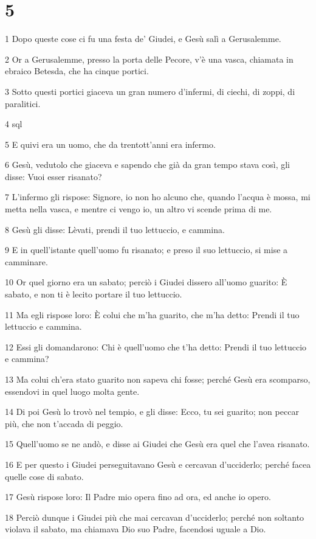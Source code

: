 \chapter{5}

\par 1 Dopo queste cose ci fu una festa de' Giudei, e Gesù salì a Gerusalemme.
\par 2 Or a Gerusalemme, presso la porta delle Pecore, v'è una vasca, chiamata in ebraico Betesda, che ha cinque portici.
\par 3 Sotto questi portici giaceva un gran numero d'infermi, di ciechi, di zoppi, di paralitici.
\par 4 sql
\par 5 E quivi era un uomo, che da trentott'anni era infermo.
\par 6 Gesù, vedutolo che giaceva e sapendo che già da gran tempo stava così, gli disse: Vuoi esser risanato?
\par 7 L'infermo gli rispose: Signore, io non ho alcuno che, quando l'acqua è mossa, mi metta nella vasca, e mentre ci vengo io, un altro vi scende prima di me.
\par 8 Gesù gli disse: Lèvati, prendi il tuo lettuccio, e cammina.
\par 9 E in quell'istante quell'uomo fu risanato; e preso il suo lettuccio, si mise a camminare.
\par 10 Or quel giorno era un sabato; perciò i Giudei dissero all'uomo guarito: È sabato, e non ti è lecito portare il tuo lettuccio.
\par 11 Ma egli rispose loro: È colui che m'ha guarito, che m'ha detto: Prendi il tuo lettuccio e cammina.
\par 12 Essi gli domandarono: Chi è quell'uomo che t'ha detto: Prendi il tuo lettuccio e cammina?
\par 13 Ma colui ch'era stato guarito non sapeva chi fosse; perché Gesù era scomparso, essendovi in quel luogo molta gente.
\par 14 Di poi Gesù lo trovò nel tempio, e gli disse: Ecco, tu sei guarito; non peccar più, che non t'accada di peggio.
\par 15 Quell'uomo se ne andò, e disse ai Giudei che Gesù era quel che l'avea risanato.
\par 16 E per questo i Giudei perseguitavano Gesù e cercavan d'ucciderlo; perché facea quelle cose di sabato.
\par 17 Gesù rispose loro: Il Padre mio opera fino ad ora, ed anche io opero.
\par 18 Perciò dunque i Giudei più che mai cercavan d'ucciderlo; perché non soltanto violava il sabato, ma chiamava Dio suo Padre, facendosi uguale a Dio.
